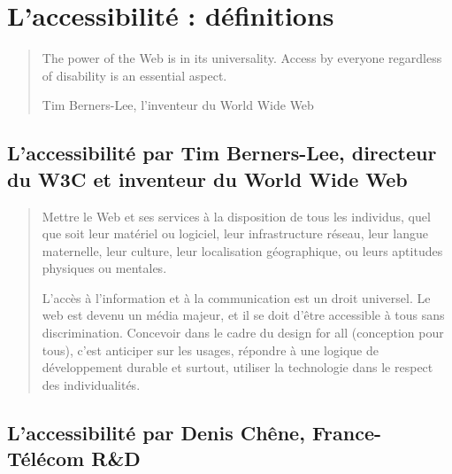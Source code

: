 \documentclass[
]{book}
\begin{document}
\hypertarget{laccessibilituxe9-duxe9finitions}{%
\section{L'accessibilité : définitions}\label{laccessibilituxe9-duxe9finitions}}

\begin{quote}
The power of the Web is in its universality. Access by everyone regardless of
disability is an essential aspect.

Tim Berners-Lee, l'inventeur du World Wide Web
\end{quote}

\hypertarget{laccessibilituxe9-par-tim-berners-lee-directeur-du-w3c-et-inventeur-du-world-wide-web}{%
\subsection{L'accessibilité par Tim Berners-Lee, directeur du W3C et inventeur du World Wide Web}\label{laccessibilituxe9-par-tim-berners-lee-directeur-du-w3c-et-inventeur-du-world-wide-web}}

\begin{quote}
Mettre le Web et ses services à la disposition de tous les individus, quel
que soit leur matériel ou logiciel, leur infrastructure réseau, leur langue
maternelle, leur culture, leur localisation géographique, ou leurs
aptitudes physiques ou mentales.

L'accès à l'information et à la communication est un droit universel. Le
web est devenu un média majeur, et il se doit d'être accessible à tous sans
discrimination. Concevoir dans le cadre du design for all (conception pour
tous), c'est anticiper sur les usages, répondre à une logique de
développement durable et surtout, utiliser la technologie dans le respect
des individualités.
\end{quote}

\hypertarget{laccessibilituxe9-par-denis-chuxeane-france-tuxe9luxe9com-rd}{%
\subsection{L'accessibilité par Denis Chêne, France-Télécom R\&D}\label{laccessibilituxe9-par-denis-chuxeane-france-tuxe9luxe9com-rd}}
\end{document}

